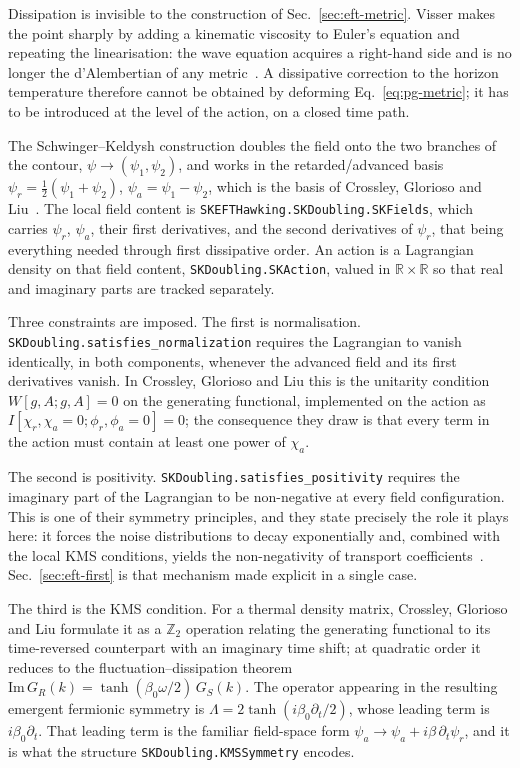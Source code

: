 \documentclass[aps,prd,reprint,nofootinbib,superscriptaddress]{revtex4-2}
\begin{document}
Dissipation is invisible to the construction of
Sec.~\ref{sec:eft-metric}. Visser makes the point sharply by adding a
kinematic viscosity to Euler's equation and repeating the linearisation:
the wave equation acquires a right-hand side and is no longer the
d'Alembertian of any metric~\cite{Visser1998}. A dissipative correction
to the horizon temperature therefore cannot be obtained by deforming
Eq.~\eqref{eq:pg-metric}; it has to be introduced at the level of the
action, on a closed time path.

The Schwinger--Keldysh construction doubles the field onto the two
branches of the contour, $\psi \to (\psi_1,\psi_2)$, and works in the
retarded/advanced basis
$\psi_r = \tfrac{1}{2}(\psi_1+\psi_2)$, $\psi_a = \psi_1 - \psi_2$, which
is the basis of Crossley, Glorioso and
Liu~\cite{CGL2017a,Crossley2017II}. The local field content is
\texttt{SKEFTHawking.SKDoubling.SKFields}, which carries $\psi_r$,
$\psi_a$, their first derivatives, and the second derivatives of
$\psi_r$, that being everything needed through first dissipative order.
An action is a Lagrangian density on that field content,
\texttt{SKDoubling.SKAction}, valued in $\mathbb{R}\times\mathbb{R}$ so
that real and imaginary parts are tracked separately.

Three constraints are imposed. The first is normalisation.
\texttt{SKDoubling.satisfies\_normalization} requires the Lagrangian to
vanish identically, in both components, whenever the advanced field and
its first derivatives vanish. In Crossley, Glorioso and Liu this is the
unitarity condition $W[g,A;g,A]=0$ on the generating functional,
implemented on the action as $I[\chi_r,\chi_a=0;\phi_r,\phi_a=0]=0$; the
consequence they draw is that every term in the action must contain at
least one power of $\chi_a$.

The second is positivity.
\texttt{SKDoubling.satisfies\_positivity} requires the imaginary part of
the Lagrangian to be non-negative at every field configuration. This is
one of their symmetry principles, and they state precisely the role it
plays here: it forces the noise distributions to decay exponentially and,
combined with the local KMS conditions, yields the non-negativity of
transport coefficients~\cite{Crossley2017II}.
Sec.~\ref{sec:eft-first} is that mechanism made explicit in a single
case.

The third is the KMS condition. For a thermal density matrix, Crossley,
Glorioso and Liu formulate it as a $\mathbb{Z}_2$ operation relating the
generating functional to its time-reversed counterpart with an imaginary
time shift; at quadratic order it reduces to the fluctuation--dissipation
theorem $\mathrm{Im}\,G_R(k) = \tanh(\beta_0\omega/2)\,G_S(k)$. The
operator appearing in the resulting emergent fermionic symmetry is
$\Lambda = 2\tanh(i\beta_0\partial_t/2)$, whose leading term is
$i\beta_0\partial_t$. That leading term is the familiar field-space form
$\psi_a \to \psi_a + i\beta\,\partial_t\psi_r$, and it is what the
structure \texttt{SKDoubling.KMSSymmetry} encodes.
\end{document}
